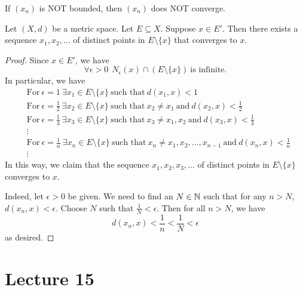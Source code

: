 \documentclass[a4paper]{book}
\begin{document}
\begin{corollary}[Contrapositive]
    If \( ({x}_{n}) \) is NOT bounded, then \( ({x}_{n}) \) does NOT converge. 
\end{corollary}

\begin{theorem}
    Let \( (X,d) \) be a metric space. Let \( E \subseteq  X \). Suppose \( x \in E' \). Then there exists a sequence \( {x}_{1}, {x}_{2}, \dots  \) of distinct points in \( E \setminus  \{ x \}  \) that converges to \( x  \). 
\end{theorem}
\begin{proof}
Since \( x \in E' \), we have 
\[  \forall \epsilon > 0  \ \ {N}_{\epsilon}(x) \cap (E \setminus  \{ x \} ) \ \text{is infinite}. \]
In particular, we have 
\begin{align*}
    &\text{For} \ \epsilon = 1 \ \exists {x}_{1} \in E \setminus  \{ x \} \ \text{such that} \ d({x}_{1}, x) < 1  \\
    &\text{For} \ \epsilon = \frac{ 1 }{ 2 }  \ \exists {x}_{2} \in E \setminus  \{ x \}  \ \text{such that} \ {x}_{2} \neq {x}_{1} \ \text{and} \ d({x}_{2}, x) < \frac{ 1 }{ 2 }  \\
    &\text{For} \ \epsilon = \frac{ 1 }{ 3 }  \ \exists {x}_{3} \in E \setminus  \{ x \}  \ \text{such that} \ {x}_{3} \neq {x}_{1}, {x}_{2} \ \text{and} \ d({x}_{3}, x) < \frac{ 1 }{ 3 }  \\
    &\vdots \\
    &\text{For} \ \epsilon = \frac{ 1 }{ n } \ \exists {x}_{n} \in E \setminus  \{ x \}  \ \text{such that} \ {x}_{n} \neq {x}_{1}, {x}_{2}, \dots, {x}_{n-1} \ \text{and} \ d({x}_{n}, x) < \frac{ 1 }{ n } \\ 
    &\vdots
\end{align*}
In this way, we claim that the sequence \( {x}_{1}, {x}_{2}, {x}_{3}, \dots \) of distinct points in \( E \setminus  \{ x \}  \) converges to \( x  \). 

Indeed, let \( \epsilon > 0   \) be given. We need to find an \( N \in \mathbb{N}  \) such that for any \( n > N  \), \( d({x}_{n}, x) < \epsilon \). Choose \( N  \) such that \( \frac{ 1 }{ N } < \epsilon  \). Then for all \( n > N  \), we have 
\[  d({x}_{n},x) < \frac{ 1 }{ n }  < \frac{ 1 }{ N }  < \epsilon \]
as desired.
\end{proof}

\section{Lecture 15}
\end{document}
